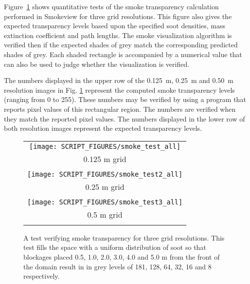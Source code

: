 \documentclass[11pt,twoside]{book}
\begin{document}
Figure~\ref{figsmoketest2} shows quantitative tests of the smoke transparency
calculation performed in Smokeview for three grid resolutions.
This figure also gives the expected transparency levels based upon the specified soot densities, mass extinction coefficient and path lengths.  The smoke visualization algorithm is verified then if the expected shades of grey match the corresponding predicted shades of grey.  Each shaded rectangle is accompanied by a numerical value that can also be used to judge whether the visualization is verified.

The numbers displayed in the upper row of the \SI{0.125}{m}, \SI{0.25}{m} and \SI{0.50}{m} resolution images in Fig. \ref{figsmoketest2} represent the computed smoke transparency levels (ranging from 0 to 255).  These numbers may be verified by using a
program that reports pixel values of this
rectangular region.  The numbers are verified when they match the reported pixel
values. The numbers displayed in the lower row of both resolution images represent the expected transparency levels.

\begin{figure}[bph]
\begin{center}
 \centering
\begin{tabular}{c}
 \texttt{[image: SCRIPT\_FIGURES/smoke\_test\_all]}\\
0.125 m grid\\ \\
 \texttt{[image: SCRIPT\_FIGURES/smoke\_test2\_all]} \\
0.25 m grid\\ \\
 \texttt{[image: SCRIPT\_FIGURES/smoke\_test3\_all]}\\
0.5 m grid\\ \\
 \end{tabular}
\end{center}
 \caption[A test verifying smoke transparency for three grid resolutions.]{A test verifying
 smoke transparency for three grid resolutions.  This test fills the space with a uniform distribution of soot so that blockages
 placed 0.5, 1.0, 2.0, 3.0, 4.0 and 5.0 m from the front of the domain result in
 in grey levels of  181, 128, 64, 32, 16 and 8 respectively.
 }
\label{figsmoketest2}%
\end{figure}
\end{document}
